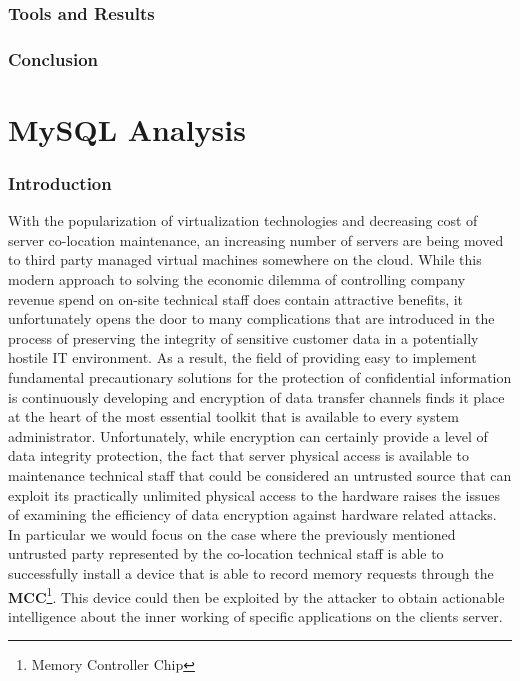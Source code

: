 \documentclass[11pt,a4paper, titlepage, oneside]{article}
\begin{document}
\section{Tools and Results}
\section{Conclusion}
\part{MySQL Analysis}
\section{Introduction}
With the popularization of virtualization technologies and decreasing cost of server co-location maintenance, an increasing number of servers are being moved to third party managed virtual machines somewhere on the cloud. While this modern approach to solving the economic dilemma of controlling company revenue spend    on on-site technical staff does contain attractive benefits, it unfortunately opens the door to many complications that are introduced in the process of preserving the integrity of sensitive customer data in a potentially hostile IT environment. As a result, the field of providing easy to implement fundamental precautionary solutions for the protection of confidential information is continuously developing and encryption of data transfer channels finds it place at the heart of the most essential toolkit that is available to every system administrator. Unfortunately, while encryption can certainly provide a level of data integrity protection, the fact that server physical access is available to maintenance technical staff that could be considered an untrusted source that can exploit its practically unlimited physical access to the hardware raises the issues of examining the efficiency of data encryption against hardware related attacks. In particular we would focus on the case where the previously mentioned untrusted party represented by the co-location technical staff is able to successfully install a device that is able to record memory requests through the \textbf{MCC}\footnote[0]{Memory Controller Chip}. This device could then be exploited by the attacker to obtain actionable intelligence about the inner working of specific applications on the clients server.
\end{document}
